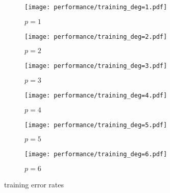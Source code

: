 \begin{figure}[h!]
    \begin{subfigure}[t]{0.49\textwidth}
        \centering
        \texttt{[image: performance/training\_deg=1.pdf]} 
        \caption{$p = 1$}
    \end{subfigure}
    \hfill
    \begin{subfigure}[t]{0.49\textwidth}
        \centering
        \texttt{[image: performance/training\_deg=2.pdf]} 
        \caption{$p = 2$}
    \end{subfigure}
    \par\bigskip
        \begin{subfigure}[t]{0.49\textwidth}
        \centering
        \texttt{[image: performance/training\_deg=3.pdf]} 
        \caption{$p = 3$}
    \end{subfigure}
    \hfill
    \begin{subfigure}[t]{0.49\textwidth}
        \centering
        \texttt{[image: performance/training\_deg=4.pdf]} 
        \caption{$p = 4$}
    \end{subfigure}
    \par\bigskip
        \begin{subfigure}[t]{0.49\textwidth}
        \centering
        \texttt{[image: performance/training\_deg=5.pdf]} 
        \caption{$p = 5$}
    \end{subfigure}
    \hfill
    \begin{subfigure}[t]{0.49\textwidth}
        \centering
        \texttt{[image: performance/training\_deg=6.pdf]} 
        \caption{$p = 6$}
    \end{subfigure}
    \caption{training error rates}
\end{figure}

